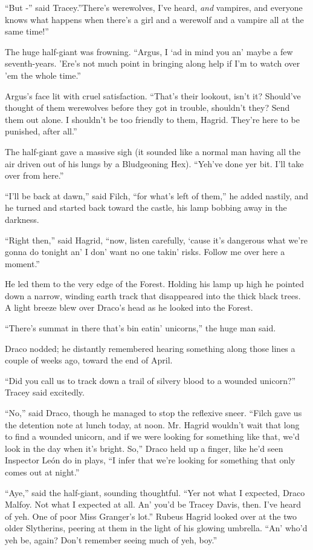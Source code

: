 ``But -'' said Tracey.''There's werewolves, I've heard, \emph{and}
vampires, and everyone knows what happens when there's a girl and a
werewolf and a vampire all at the same time!''

The huge half-giant was frowning. ``Argus, I `ad in mind you an' maybe a
few seventh-years. 'Ere's not much point in bringing along help if I'm
to watch over 'em the whole time.''

Argus's face lit with cruel satisfaction. ``That's their lookout, isn't
it? Should've thought of them werewolves before they got in trouble,
shouldn't they? Send them out alone. I shouldn't be too friendly to
them, Hagrid. They're here to be punished, after all.''

The half-giant gave a massive sigh (it sounded like a normal man having
all the air driven out of his lungs by a Bludgeoning Hex). ``Yeh've done
yer bit. I'll take over from here.''

``I'll be back at dawn,'' said Filch, ``for what's left of them,'' he
added nastily, and he turned and started back toward the castle, his
lamp bobbing away in the darkness.

``Right then,'' said Hagrid, ``now, listen carefully, `cause it's
dangerous what we're gonna do tonight an' I don' want no one takin'
risks. Follow me over here a moment.''

He led them to the very edge of the Forest. Holding his lamp up high he
pointed down a narrow, winding earth track that disappeared into the
thick black trees. A light breeze blew over Draco's head as he looked
into the Forest.

``There's summat in there that's bin eatin' unicorns,'' the huge man
said.

Draco nodded; he distantly remembered hearing something along those
lines a couple of weeks ago, toward the end of April.

``Did you call us to track down a trail of silvery blood to a wounded
unicorn?'' Tracey said excitedly.

``No,'' said Draco, though he managed to stop the reflexive sneer.
``Filch gave us the detention note at lunch today, at noon. Mr. Hagrid
wouldn't wait that long to find a wounded unicorn, and if we were
looking for something like that, we'd look in the day when it's bright.
So,'' Draco held up a finger, like he'd seen Inspector León do in plays,
``I infer that we're looking for something that only comes out at
night.''

``Aye,'' said the half-giant, sounding thoughtful. ``Yer not what I
expected, Draco Malfoy. Not what I expected at all. An' you'd be Tracey
Davis, then. I've heard of yeh. One of poor Miss Granger's lot.'' Rubeus
Hagrid looked over at the two older Slytherins, peering at them in the
light of his glowing umbrella. ``An' who'd yeh be, again? Don't remember
seeing much of yeh, boy.''

